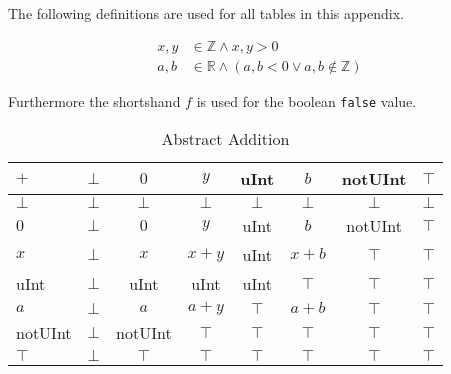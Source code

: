 The following definitions are used for all tables in this appendix.

\begin{align*}
x, y &\in \mathbb{Z} \wedge x, y > 0 \\
a, b &\in \mathbb{R} \wedge (a, b < 0 \vee a, b \notin \mathbb{Z})
\end{align*}

Furthermore the shortshand $f$ is used for the boolean \texttt{false} value.

\begin{table}[htbp]
\centering
\begin{tabular}{l| c c c c c c c}
$+$     & $\bot$& $0$       & $y$   & uInt  & $b$   & notUInt   & $\top$ \\
\hline
$\bot$  & $\bot$& $\bot$    & $\bot$& $\bot$& $\bot$& $\bot$    & $\bot$ \\
$0$     & $\bot$& $0$       & $y$   & uInt  & $b$   & notUInt   & $\top$ \\
$x$     & $\bot$& $x$       & $x+y$ & uInt  & $x+b$ & $\top$    & $\top$ \\
uInt    & $\bot$& uInt      & uInt  & uInt  & $\top$& $\top$    & $\top$ \\
$a$     & $\bot$& $a$       & $a+y$ & $\top$& $a+b$ & $\top$    & $\top$ \\
notUInt & $\bot$& notUInt   & $\top$& $\top$& $\top$& $\top$    & $\top$ \\
$\top$  & $\bot$& $\top$    & $\top$& $\top$& $\top$& $\top$    & $\top$ \\
\end{tabular}
\caption{Abstract Addition}
\label{tab:abstract_addition}
\end{table}

